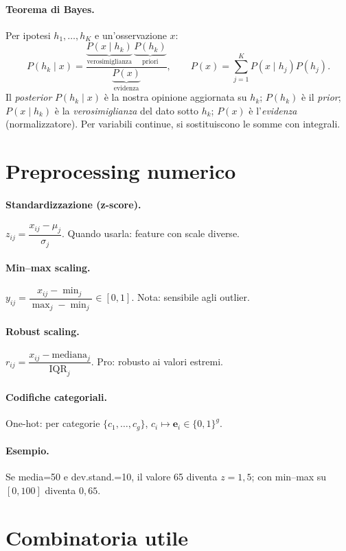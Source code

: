 \paragraph{Teorema di Bayes.}
Per ipotesi $h_1,\dots,h_K$ e un’osservazione $x$:
\[
P(h_k\mid x)=\frac{\underbrace{P(x\mid h_k)}_{\text{verosimiglianza}}\,
\underbrace{P(h_k)}_{\text{priori}}}
{\underbrace{P(x)}_{\text{evidenza}}},\qquad
P(x)=\sum_{j=1}^{K}P(x\mid h_j)P(h_j).
\]
Il \emph{posterior} $P(h_k\mid x)$ è la nostra opinione aggiornata su $h_k$; $P(h_k)$ è il \emph{prior};
$P(x\mid h_k)$ è la \emph{verosimiglianza} del dato sotto $h_k$; $P(x)$ è l’\emph{evidenza} (normalizzatore).
Per variabili continue, si sostituiscono le somme con integrali.

\section{Preprocessing numerico}\label{sec:scaling}
\paragraph{Standardizzazione (z-score).} \(z_{ij}=\dfrac{x_{ij}-\mu_j}{\sigma_j}\). Quando usarla: feature con scale diverse.
\paragraph{Min--max scaling.} \(y_{ij}=\dfrac{x_{ij}-\min_j}{\max_j-\min_j}\in[0,1]\). Nota: sensibile agli outlier.
\paragraph{Robust scaling.} \(r_{ij}=\dfrac{x_{ij}-\mathrm{mediana}_j}{\mathrm{IQR}_j}\). Pro: robusto ai valori estremi.
\paragraph{Codifiche categoriali.} One-hot: per categorie \(\{c_1,\dots,c_g\}\), \(c_i\mapsto\mathbf{e}_i\in\{0,1\}^g\).
\paragraph{Esempio.} Se media=50 e dev.stand.=10, il valore 65 diventa \(z=1{,}5\); con min--max su \([0,100]\) diventa \(0{,}65\).

\section{Combinatoria utile}\label{sec:comb}
